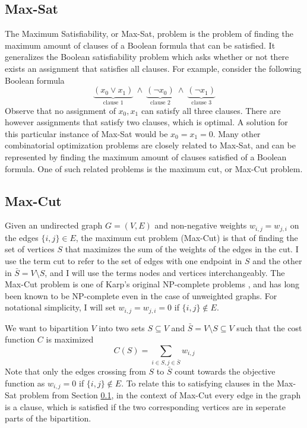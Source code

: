 \subsection{Max-Sat}
\label{sec:max-sat}
The Maximum Satisfiability, or Max-Sat, problem is the problem of finding the maximum amount of clauses of a Boolean formula that can be satisfied. It generalizes the Boolean satisfiability problem which asks whether or not there exists an assignment that satisfies all clauses. For example, consider the following Boolean formula
\begin{equation}
	\underbrace{(x_0 \vee x_1)}_{\text{clause 1}} \: \wedge \: \underbrace{(\neg x_0)}_{\text{clause 2}} \: \wedge \: \underbrace{(\neg x_1)}_{\text{clause 3}}
\end{equation}
Observe that no assignment of $x_0, x_1$ can satisfy all three clauses. There are however assignments that satisfy two clauses, which is optimal. A solution for this particular instance of Max-Sat would be $x_0 = x_1 = 0$. 
 Many other combinatorial optimization problems are closely related to Max-Sat, and can be represented by finding the maximum amount of clauses satisfied of a Boolean formula. One of such related problems is the maximum cut, or Max-Cut problem.

\subsection{Max-Cut}
\label{section:maxcut}
Given an undirected graph $G = (V, E)$ and non-negative weights $w_{i,j} = w_{j,i}$ on the edges $\{i, j\} \in E$, the maximum cut problem (Max-Cut) is that of finding the set of vertices $S$ that maximizes the sum of the weights of the edges in the cut. I use the term cut to refer to the set of edges with one endpoint in $S$ and the other in $\bar{S} = V \setminus S$, and I will use the terms nodes and vertices interchangeably. The Max-Cut problem is one of Karp’s original NP-complete problems \cite{Karp72}, and has long been known to be NP-complete even in the case of unweighted graphs. For notational simplicity, I will set $w_{i,j} = w_{j,i} = 0$ if $\{i,j\} \notin E$.

We want to bipartition $V$ into two sets $S \subseteq V$ and $\bar{S} = V \setminus S \subseteq V$ such that the cost function $C$ is maximized
\begin{equation}
	C(S) = \sum_{i \in S, j \in \bar{S}} w_{i,j}
	\label{eq:maxcut set objective}
\end{equation}
Note that only the edges crossing from $S$ to $\bar{S}$ count towards the objective function as $w_{i,j} = 0$ if $\{i,j\} \notin E$. To relate this to satisfying clauses in the Max-Sat problem from Section \ref{sec:max-sat}, in the context of Max-Cut every edge in the graph is a clause, which is satisfied if the two corresponding vertices are in seperate parts of the bipartition.

